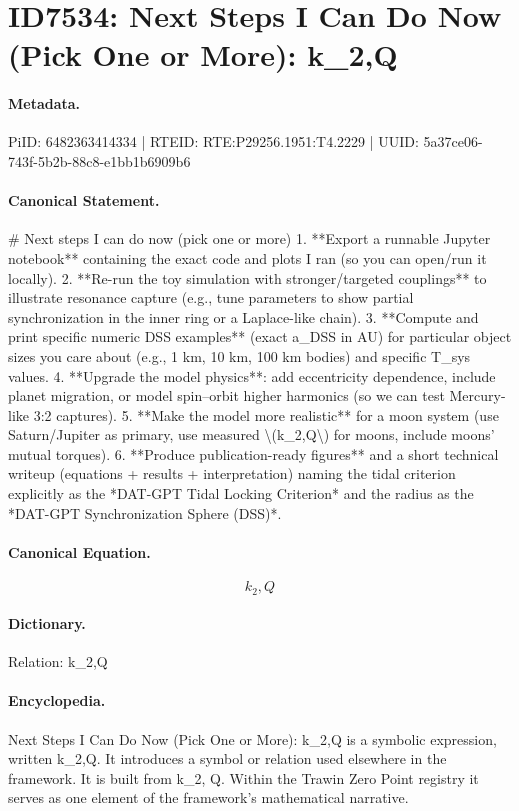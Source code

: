 \section*{ID7534: Next Steps I Can Do Now (Pick One or More): k\_2,Q}
\paragraph{Metadata.}
PiID: 6482363414334 | RTEID: RTE:P29256.1951:T4.2229 | UUID: 5a37ce06-743f-5b2b-88c8-e1bb1b6909b6

\paragraph{Canonical Statement.}
\# Next steps I can do now (pick one or more) 1. **Export a runnable Jupyter notebook** containing the exact code and plots I ran (so you can open/run it locally). 2. **Re-run the toy simulation with stronger/targeted couplings** to illustrate resonance capture (e.g., tune parameters to show partial synchronization in the inner ring or a Laplace-like chain). 3. **Compute and print specific numeric DSS examples** (exact a\_DSS in AU) for particular object sizes you care about (e.g., 1 km, 10 km, 100 km bodies) and specific T\_sys values. 4. **Upgrade the model physics**: add eccentricity dependence, include planet migration, or model spin–orbit higher harmonics (so we can test Mercury-like 3:2 captures). 5. **Make the model more realistic** for a moon system (use Saturn/Jupiter as primary, use measured \textbackslash{}(k\_2,Q\textbackslash{}) for moons, include moons’ mutual torques). 6. **Produce publication-ready figures** and a short technical writeup (equations + results + interpretation) naming the tidal criterion explicitly as the *DAT-GPT Tidal Locking Criterion* and the radius as the *DAT-GPT Synchronization Sphere (DSS)*.

\paragraph{Canonical Equation.}
\[
k_2,Q
\]

\paragraph{Dictionary.}
Relation: k\_2,Q

\paragraph{Encyclopedia.}
Next Steps I Can Do Now (Pick One or More): k\_2,Q is a symbolic expression, written k\_2,Q. It introduces a symbol or relation used elsewhere in the framework. It is built from k\_2, Q. Within the Trawin Zero Point registry it serves as one element of the framework's mathematical narrative.
